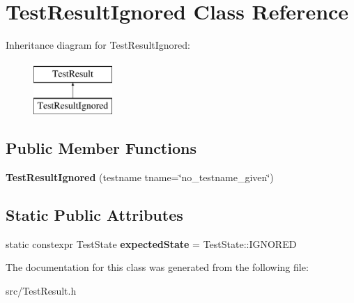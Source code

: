 \hypertarget{class_test_result_ignored}{\section{Test\-Result\-Ignored Class Reference}
\label{class_test_result_ignored}
}
Inheritance diagram for Test\-Result\-Ignored\-:\begin{figure}[H]
\begin{center}
\leavevmode
\includegraphics[height=2.000000cm]{class_test_result_ignored}
\end{center}
\end{figure}
\subsection*{Public Member Functions}
\begin{DoxyCompactItemize}
\item 
\hypertarget{class_test_result_ignored_a8e45a34b8fc35a578170778657b5222a}{{\bfseries Test\-Result\-Ignored} (testname tname=\char`\"{}no\-\_\-testname\-\_\-given\char`\"{})}\label{class_test_result_ignored_a8e45a34b8fc35a578170778657b5222a}

\end{DoxyCompactItemize}
\subsection*{Static Public Attributes}
\begin{DoxyCompactItemize}
\item 
\hypertarget{class_test_result_ignored_a8dabc18d9c38087ae9eedc66fd8a6899}{static constexpr Test\-State {\bfseries expected\-State} = Test\-State\-::\-I\-G\-N\-O\-R\-E\-D}\label{class_test_result_ignored_a8dabc18d9c38087ae9eedc66fd8a6899}

\end{DoxyCompactItemize}


The documentation for this class was generated from the following file\-:\begin{DoxyCompactItemize}
\item 
src/Test\-Result.\-h\end{DoxyCompactItemize}
